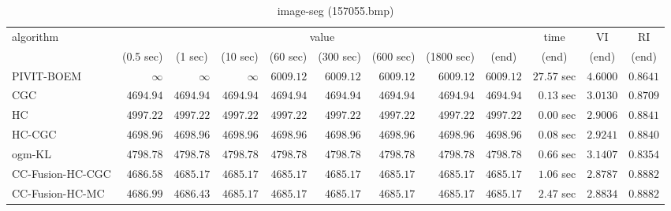 \begin{table}[H]
\scriptsize
\centering
\caption{image-seg (157055.bmp)}
\label{tab:anytimetable-image-seg-157055.bmp}
\begin{tabular}{lrrrrrrrrrrr}
\toprule
           algorithm &                                   \multicolumn{8}{c}{value} & \multicolumn{1}{c}{time}    & \multicolumn{1}{c}{VI}  & \multicolumn{1}{c}{RI} \\  
\cmidrule(lr){2-9}\cmidrule(lr){10-10} \cmidrule(lr){11-11} \cmidrule(lr){12-12}   
                     & \multicolumn{1}{c}{(0.5 sec)} & \multicolumn{1}{c}{(1 sec)} & \multicolumn{1}{c}{(10 sec)} & \multicolumn{1}{c}{(60 sec)} & \multicolumn{1}{c}{(300 sec)} & \multicolumn{1}{c}{(600 sec)} & \multicolumn{1}{c}{(1800 sec)} & \multicolumn{1}{c}{(end)} & \multicolumn{1}{c}{(end)}    & \multicolumn{1}{c}{(end)}   & \multicolumn{1}{c}{(end)}  \\ \midrule 
          PIVIT-BOEM & $\infty$ & $\infty$ & $\infty$ & $      6009.12$ & $      6009.12$ & $      6009.12$ & $      6009.12$ & $      6009.12$ & $        27.57$ sec    & $       4.6000$  & $       0.8641$ \\ 
                 CGC & $      4694.94$ & $      4694.94$ & $      4694.94$ & $      4694.94$ & $      4694.94$ & $      4694.94$ & $      4694.94$ & $      4694.94$ & $         0.13$ sec    & $       3.0130$  & $       0.8709$ \\ 
                  HC & $      4997.22$ & $      4997.22$ & $      4997.22$ & $      4997.22$ & $      4997.22$ & $      4997.22$ & $      4997.22$ & $      4997.22$ & $         0.00$ sec    & $       2.9006$  & $       0.8841$ \\ 
              HC-CGC & $      4698.96$ & $      4698.96$ & $      4698.96$ & $      4698.96$ & $      4698.96$ & $      4698.96$ & $      4698.96$ & $      4698.96$ & $         0.08$ sec    & $       2.9241$  & $       0.8840$ \\ 
              ogm-KL & $      4798.78$ & $      4798.78$ & $      4798.78$ & $      4798.78$ & $      4798.78$ & $      4798.78$ & $      4798.78$ & $      4798.78$ & $         0.66$ sec    & $       3.1407$  & $       0.8354$ \\ 
    CC-Fusion-HC-CGC & $      4686.58$ & $      4685.17$ & $      4685.17$ & $      4685.17$ & $      4685.17$ & $      4685.17$ & $      4685.17$ & $      4685.17$ & $         1.06$ sec    & $       2.8787$  & $       0.8882$ \\ 
     CC-Fusion-HC-MC & $      4686.99$ & $      4686.43$ & $      4685.17$ & $      4685.17$ & $      4685.17$ & $      4685.17$ & $      4685.17$ & $      4685.17$ & $         2.47$ sec    & $       2.8834$  & $       0.8882$ \\ 

\end{tabular}
\end{table}
